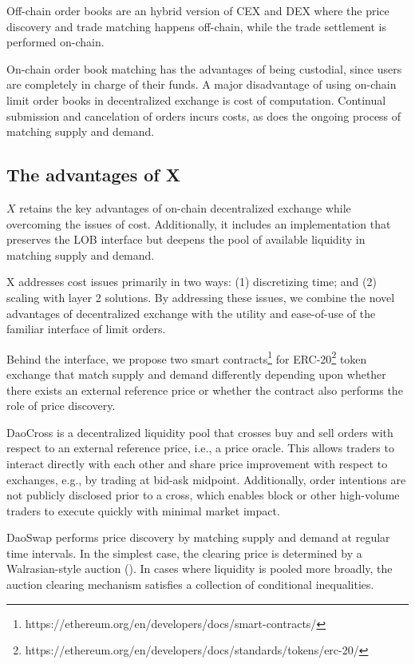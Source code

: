 \documentclass[11pt, reqno]{amsart}
\theoremstyle{definition}
\theoremstyle{remark}
\begin{document}
Off-chain order books are an hybrid version of CEX and DEX where the price
discovery and trade matching happens off-chain, while the trade settlement is
performed on-chain.

On-chain order book matching has the advantages of being custodial, since users
are completely in charge of their funds.
A major disadvantage of using on-chain limit order books in decentralized
exchange is cost of computation. Continual submission and cancelation of orders
incurs costs, as does the ongoing process of matching supply and demand.

\subsection{The advantages of X}

$X$ retains the key advantages of on-chain decentralized exchange while
overcoming the issues of cost. Additionally, it includes an implementation
that preserves the LOB interface but deepens the pool of available
liquidity in matching supply and demand.

X addresses cost issues primarily in two ways: (1) discretizing time; and (2)
scaling with layer 2 solutions. By addressing these issues, we combine the novel
advantages of decentralized exchange with the utility and ease-of-use of the
familiar interface of limit orders.

Behind the interface, we propose two smart
contracts\footnote{https://ethereum.org/en/developers/docs/smart-contracts/}
for
ERC-20\footnote{https://ethereum.org/en/developers/docs/standards/tokens/erc-20/}
token exchange that match supply and demand differently depending upon whether
there exists an external reference price or whether the contract also performs
the role of price discovery.

DaoCross is a decentralized liquidity pool that crosses buy and sell orders
with respect to an external reference price, i.e., a price oracle. This allows
traders to interact directly with each other and share price improvement with
respect to exchanges, e.g., by trading at bid-ask midpoint. Additionally, order
intentions are not publicly disclosed prior to a cross, which enables block or
other high-volume traders to execute quickly with minimal market impact.

DaoSwap performs price discovery by matching supply and demand at regular time
intervals. In the simplest case, the clearing price is determined by a
Walrasian-style auction (\cite{Wa}). In cases where liquidity is pooled more
broadly, the auction clearing mechanism satisfies a collection of conditional
inequalities.
\end{document}
